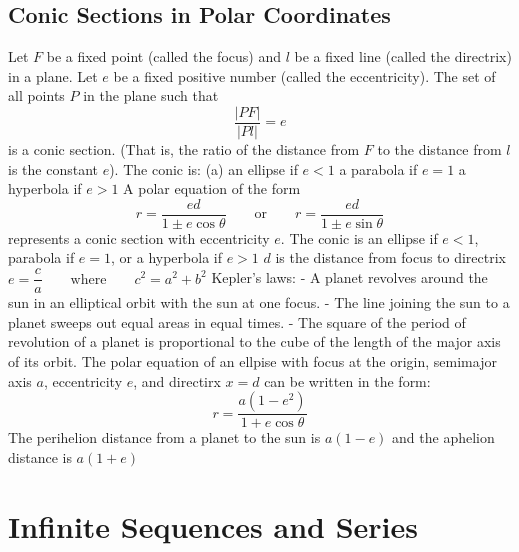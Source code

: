 \documentclass{article}
\begin{document}
    \subsection{Conic Sections in Polar Coordinates}
    \begin{outline}
        \1 Let $F$ be a fixed point (called the focus) and $l$ be a fixed line (called the directrix) in a plane. Let $e$ be a fixed positive number (called the eccentricity). The set of all points $P$ in the plane such that \[\dfrac{|PF|}{|Pl|}=e\] is a conic section. (That is, the ratio of the distance from $F$ to the distance from $l$ is the constant $e$). The conic is: 
            \2 (a) an ellipse if \(e<1\)
            \2 a parabola if \(e=1\)
            \2 a hyperbola if \(e>1\)
        \1 A polar equation of the form \[r=\dfrac{ed}{1\pm e\cos\theta}\qquad\text{or}\qquad r=\dfrac{ed}{1\pm e\sin\theta}\] represents a conic section with eccentricity $e$. The conic is an ellipse if \(e<1\), parabola if \(e=1\), or a hyperbola if \(e>1\)
            \2 $d$ is the distance from focus to directrix
        \1 \(e=\dfrac{c}{a}\qquad\text{where}\qquad c^2=a^2+b^2\)
        \1 Kepler's laws: 
             - A planet revolves around the sun in an elliptical orbit with the sun at one focus. 
             - The line joining the sun to a planet sweeps out equal areas in equal times. 
             - The square of the period of revolution of a planet is proportional to the cube of the length of the major axis of its orbit. 
        \1 The polar equation of an ellpise with focus at the origin, semimajor axis $a$, eccentricity $e$, and directirx \(x=d\) can be written in the form: \[r=\dfrac{a(1-e^2)}{1+e\cos\theta}\]
        \1 The perihelion distance from a planet to the sun is \(a(1-e)\) and the aphelion distance is \(a(1+e)\)
    \end{outline}
    
    \section{Infinite Sequences and Series} %
    
\end{document}
